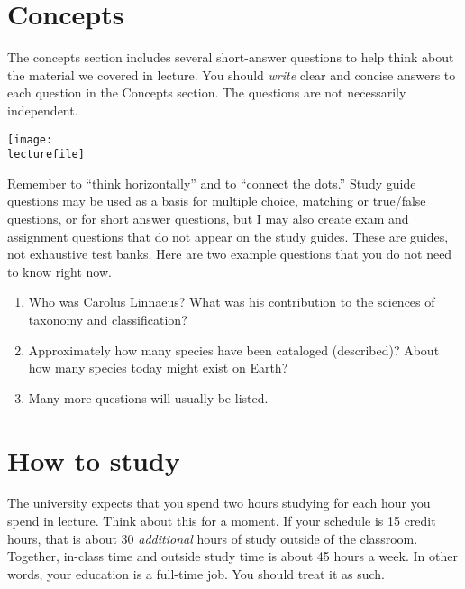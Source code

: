 \documentclass[letterpaper]{tufte-handout}
\newcommand\lecturefile{163_lecture00_fullsize}
\begin{document}
\section{Concepts}

The concepts section includes several short-answer questions to help think about the material we covered in lecture. You should \emph{write} clear and concise answers to each question in the Concepts section.  The questions are not necessarily independent.  
\begin{marginfigure}
	\texttt{[image: \\lecturefile]}
\end{marginfigure}


Remember to “think horizontally” and to “connect the dots.”  Study guide questions may be used as a basis for multiple choice, matching or true/false questions, or for short answer questions, but I may also create exam and assignment questions that do not appear on the study guides.  These are guides, not exhaustive test banks. Here are two example questions that you do not need to know right now.


\begin{enumerate}
	\item Who was Carolus Linnaeus? What was his contribution to the sciences of taxonomy and classification?

	\item Approximately how many species have been cataloged (described)? About how many species today might exist on Earth?
	
	\item Many more questions will usually be listed.
	
\end{enumerate}

\section{How to study}

The university expects that you spend two hours studying for each hour you spend in lecture. Think about this for a moment. If your schedule is 15 credit hours, that is about 30 \emph{additional} hours of study outside of the classroom. Together, in-class time and outside study time is about 45 hours a week. In other words, your education is a full-time job.  You should treat it as such.
\end{document}
